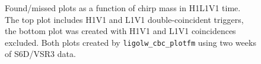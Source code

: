 \begin{figure}[p]
\center
{}
\label{fig:V1doubles-found_missed}
\caption{Found/missed plots as a function of chirp mass in H1L1V1 time. The top plot includes H1V1 and L1V1 double-coincident triggers, the bottom plot was created with H1V1 and L1V1 coincidences excluded. Both plots created by \texttt{ligolw\_cbc\_plotfm} using two weeks of S6D/VSR3 data.}
\end{figure}

